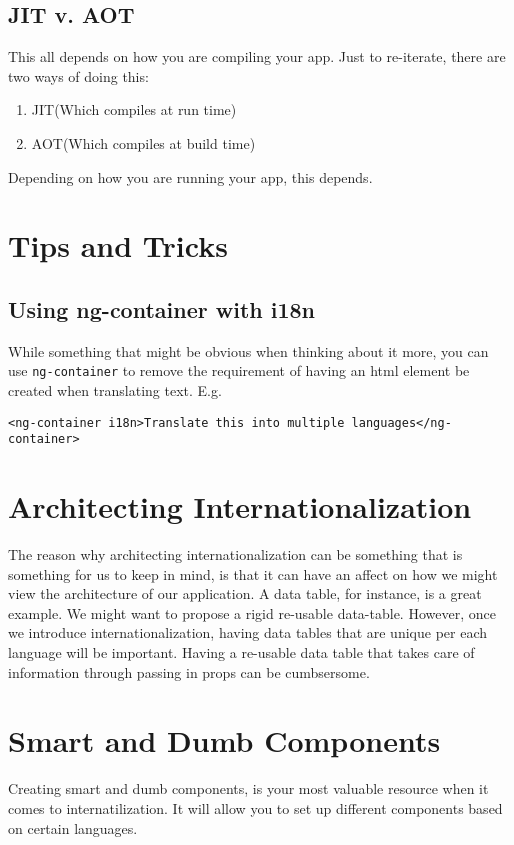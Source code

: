 \subsection{JIT v. AOT}
This all depends on how you are compiling your app. Just to re-iterate, there
are two ways of doing this:
\begin{enumerate}
  \item JIT(Which compiles at run time)
  \item AOT(Which compiles at build time)
\end{enumerate}

Depending on how you are running your app, this depends.

\section{Tips and Tricks}
\subsection{Using ng-container with i18n}
While something that might be obvious when thinking about it more, you can use 
\lstinline{ng-container} to remove the requirement of having an html element 
be created when translating text. E.g. 
\begin{lstlisting}
<ng-container i18n>Translate this into multiple languages</ng-container>
\end{lstlisting}

\section{ Architecting Internationalization }
The reason why architecting internationalization can be something that is
something for us to keep in mind, is that it can have an affect on how we might
view the architecture of our application. A data table, for instance, is a great
example. We might want to propose a rigid re-usable data-table. However, once
we introduce internationalization, having data tables that are unique per each
language will be important. Having a re-usable data table that takes care of
information through passing in props can be cumbsersome.

\section{ Smart and Dumb Components }
Creating smart and dumb components, is your most valuable resource when it comes
to internatilization. It will allow you to set up different components based on
certain languages. 
